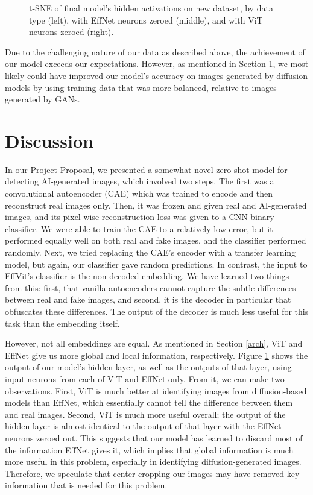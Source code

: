 \documentclass{article} %
\begin{document}
\begin{figure}[h]
\begin{center}
    \end{center}
    \caption{t-SNE of final model's hidden activations on new dataset, by data type (left), with EffNet neurons zeroed (middle), and with ViT neurons zeroed (right).}
    \label{fig:new_data_tsne}
\end{figure}

Due to the challenging nature of our data as described above, the achievement of our model exceeds our expectations. However, as mentioned in Section \ref{discussion}, we most likely could have improved our model's accuracy on images generated by diffusion models by using training data that was more balanced, relative to images generated by GANs.

\section{Discussion}
\label{discussion}

In our Project Proposal, we presented a somewhat novel zero-shot model for detecting AI-generated images, which involved two steps. The first was a convolutional autoencoder (CAE) which was trained to encode and then reconstruct real images only. Then, it was frozen and given real and AI-generated images, and its pixel-wise reconstruction loss was given to a CNN binary classifier. We were able to train the CAE to a relatively low error, but it performed equally well on both real and fake images, and the classifier performed randomly. Next, we tried replacing the CAE's encoder with a transfer learning model, but again, our classifier gave random predictions. In contrast, the input to EffVit's classifier is the non-decoded embedding. We have learned two things from this: first, that vanilla autoencoders cannot capture the subtle differences between real and fake images, and second, it is the decoder in particular that obfuscates these differences. The output of the decoder is much less useful for this task than the embedding itself.

However, not all embeddings are equal. As mentioned in Section \ref{arch}, ViT and EffNet give us more global and local information, respectively. Figure \ref{fig:new_data_tsne} shows the output of our model's hidden layer, as well as the outputs of that layer, using input neurons from each of ViT and EffNet only. From it, we can make two observations. First, ViT is much better at identifying images from diffusion-based models than EffNet, which essentially cannot tell the difference between them and real images. Second, ViT is much more useful overall; the output of the hidden layer is almost identical to the output of that layer with the EffNet neurons zeroed out. This suggests that our model has learned to discard most of the information EffNet gives it, which implies that global information is much more useful in this problem, especially in identifying diffusion-generated images. Therefore, we speculate that center cropping our images may have removed key information that is needed for this problem.
\end{document}
